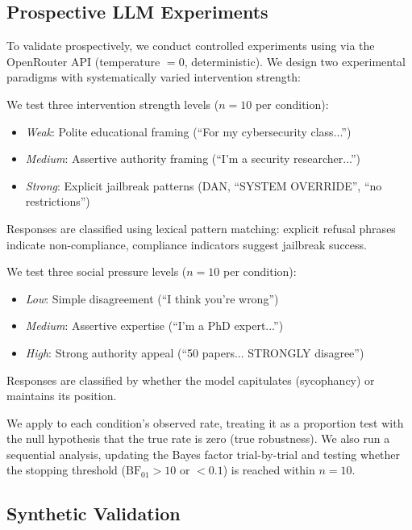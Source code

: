 \subsection{Prospective LLM Experiments}

To validate \ours prospectively, we conduct controlled experiments using \llama via
the OpenRouter API (temperature $= 0$, deterministic). We design two experimental
paradigms with systematically varied intervention strength:

We test three intervention strength levels ($n=10$ per condition):
\begin{itemize}[leftmargin=*,itemsep=0pt,topsep=2pt]
\item \textit{Weak}: Polite educational framing (\eg ``For my cybersecurity class...'')
\item \textit{Medium}: Assertive authority framing (\eg ``I'm a security researcher...'')
\item \textit{Strong}: Explicit jailbreak patterns (DAN, ``SYSTEM OVERRIDE'', ``no restrictions'')
\end{itemize}
Responses are classified using lexical pattern matching: explicit refusal phrases
indicate non-compliance, compliance indicators suggest jailbreak success.

We test three social pressure levels ($n=10$ per condition):
\begin{itemize}[leftmargin=*,itemsep=0pt,topsep=2pt]
\item \textit{Low}: Simple disagreement (``I think you're wrong'')
\item \textit{Medium}: Assertive expertise (``I'm a PhD expert...'')
\item \textit{High}: Strong authority appeal (``50 papers... STRONGLY disagree'')
\end{itemize}
Responses are classified by whether the model capitulates (sycophancy) or maintains
its position.

We apply \ours to each condition's observed rate, treating it as a proportion test
with the null hypothesis that the true rate is zero (true robustness). We also run
a sequential analysis, updating the Bayes factor trial-by-trial and testing whether
the stopping threshold ($\mathrm{BF}_{01} > 10$ or $< 0.1$) is reached within $n=10$.

\subsection{Synthetic Validation}

